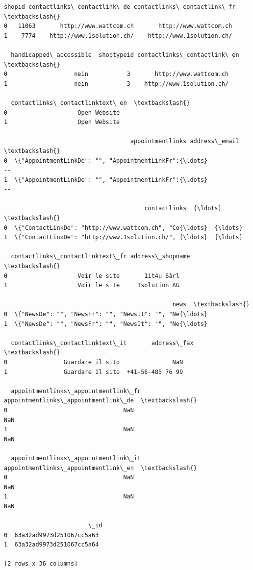 \documentclass[11pt]{article}
\makeatletter
\newcommand{\boxspacing}{\kern\kvtcb@left@rule\kern\kvtcb@boxsep}
\newcommand{\prompt}[4]{
        {\ttfamily\llap{{\color{#2}[#3]:\hspace{3pt}#4}}\vspace{-\baselineskip}}
    }
\makeatother
\begin{document}
            \begin{tcolorbox}[breakable, size=fbox, boxrule=.5pt, pad at break*=1mm, opacityfill=0]
\prompt{Out}{outcolor}{19}{\boxspacing}
\begin{Verbatim}[commandchars=\\\{\}]
   shopid contactlinks\_contactlink\_de contactlinks\_contactlink\_fr  \textbackslash{}
0   11063       http://www.wattcom.ch       http://www.wattcom.ch
1    7774    http://www.1solution.ch/    http://www.1solution.ch/

  handicapped\_accessible  shoptypeid contactlinks\_contactlink\_en  \textbackslash{}
0                   nein           3       http://www.wattcom.ch
1                   nein           3    http://www.1solution.ch/

  contactlinks\_contactlinktext\_en  \textbackslash{}
0                    Open Website
1                    Open Website

                                    appointmentlinks address\_email  \textbackslash{}
0  \{"AppointmentLinkDe": "", "AppointmentLinkFr":{\ldots}            --
1  \{"AppointmentLinkDe": "", "AppointmentLinkFr":{\ldots}            --

                                        contactlinks  {\ldots}  \textbackslash{}
0  \{"ContactLinkDe": "http://www.wattcom.ch", "Co{\ldots}  {\ldots}
1  \{"ContactLinkDe": "http://www.1solution.ch/", {\ldots}  {\ldots}

  contactlinks\_contactlinktext\_fr address\_shopname  \textbackslash{}
0                    Voir le site       1it4u Sàrl
1                    Voir le site     1solution AG

                                                news  \textbackslash{}
0  \{"NewsDe": "", "NewsFr": "", "NewsIt": "", "Ne{\ldots}
1  \{"NewsDe": "", "NewsFr": "", "NewsIt": "", "Ne{\ldots}

  contactlinks\_contactlinktext\_it       address\_fax  \textbackslash{}
0                Guardare il sito               NaN
1                Guardare il sito  +41-56-485 76 99

  appointmentlinks\_appointmentlink\_fr appointmentlinks\_appointmentlink\_de  \textbackslash{}
0                                 NaN                                 NaN
1                                 NaN                                 NaN

  appointmentlinks\_appointmentlink\_it appointmentlinks\_appointmentlink\_en  \textbackslash{}
0                                 NaN                                 NaN
1                                 NaN                                 NaN

                        \_id
0  63a32ad9973d251067cc5a63
1  63a32ad9973d251067cc5a64

[2 rows x 36 columns]
\end{Verbatim}
\end{tcolorbox}
        
\end{document}
